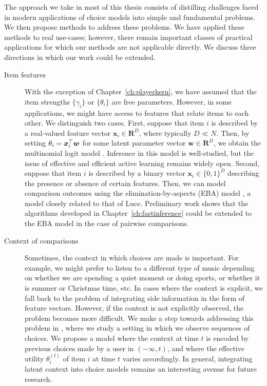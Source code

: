 The approach we take in most of this thesis consists of distilling challenges faced in modern applications of choice models into simple and fundamental problems.
We then propose methods to address these problems.
We have applied these methods to real use-cases; however, there remain important classes of practical applications for which our methods are not applicable directly.
We discuss three directions in which our work could be extended.

\begin{description}
\item[Item features] With the exception of Chapter~\ref{ch:playerkern}, we have assumed that the item strengths $\{ \gamma_i \}$ or $\{ \theta_i \}$ are free parameters.
However, in some applications, we might have access to features that relate items to each other.
We distinguish two cases.
First, suppose that item $i$ is described by a real-valued feature vector $\bm{x}_i \in \mathbf{R}^D$, where typically $D \ll N$.
Then, by setting $\theta_i = \bm{x}_i^\top \bm{w}$ for some latent parameter vector $\bm{w} \in \mathbf{R}^D$, we obtain the multinomial logit model \citep{mcfadden1973conditional, train2009discrete}.
Inference in this model is well-studied, but the issue of effective and efficient active learning remains widely open.
Second, suppose that item $i$ is described by a binary vector $\bm{x}_i \in \{0, 1\}^D$ describing the presence or absence of certain features.
Then, we can model comparison outcomes using the elimination-by-aspects (EBA) model \citep{tversky1972elimination}, a model closely related to that of Luce.
Preliminary work shows that the algorithms developed in Chapter~\ref{ch:fastinference} could be extended to the EBA model in the case of pairwise comparisons.

\item[Context of comparisons] Sometimes, the context in which choices are made is important.
For example, we might prefer to listen to a different type of music depending on whether we are spending a quiet moment or doing sports, or whether it is summer or Christmas time, etc.
In cases where the context is explicit, we fall back to the problem of integrating side information in the form of feature vectors.
However, if the context is not explicitly observed, the problem becomes more difficult.
We make a step towards addressing this problem in \citet{ko2016collaborative}, where we study a setting in which we observe sequences of choices.
We propose a model where the context at time $t$ is encoded by previous choices made by a user in $(-\infty, t)$, and where the effective utility $\theta_i^{(t)}$ of item $i$ at time $t$ varies accordingly.
In general, integrating latent context into choice models remains an interesting avenue for future research.


\end{description}
